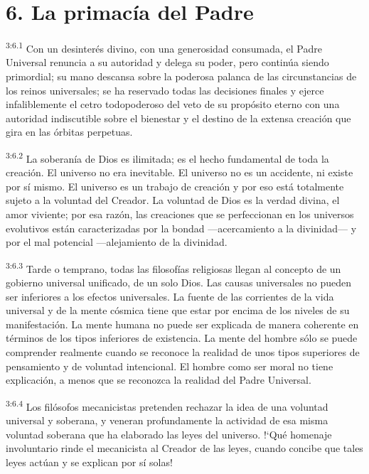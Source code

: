 \section*{6. La primacía del Padre}
\par
\textsuperscript{3:6.1} Con un desinterés divino, con una generosidad consumada, el Padre Universal renuncia a su autoridad y delega su poder, pero continúa siendo primordial; su mano descansa sobre la poderosa palanca de las circunstancias de los reinos universales; se ha reservado todas las decisiones finales y ejerce infaliblemente el cetro todopoderoso del veto de su propósito eterno con una autoridad indiscutible sobre el bienestar y el destino de la extensa creación que gira en las órbitas perpetuas.

\par
\textsuperscript{3:6.2} La soberanía de Dios es ilimitada; es el hecho fundamental de toda la creación. El universo no era inevitable. El universo no es un accidente, ni existe por sí mismo. El universo es un trabajo de creación y por eso está totalmente sujeto a la voluntad del Creador. La voluntad de Dios es la verdad divina, el amor viviente; por esa razón, las creaciones que se perfeccionan en los universos evolutivos están caracterizadas por la bondad ---acercamiento a la divinidad--- y por el mal potencial ---alejamiento de la divinidad.

\par
\textsuperscript{3:6.3} Tarde o temprano, todas las filosofías religiosas llegan al concepto de un gobierno universal unificado, de un solo Dios. Las causas universales no pueden ser inferiores a los efectos universales. La fuente de las corrientes de la vida universal y de la mente cósmica tiene que estar por encima de los niveles de su manifestación. La mente humana no puede ser explicada de manera coherente en términos de los tipos inferiores de existencia. La mente del hombre sólo se puede comprender realmente cuando se reconoce la realidad de unos tipos superiores de pensamiento y de voluntad intencional. El hombre como ser moral no tiene explicación, a menos que se reconozca la realidad del Padre Universal.

\par
\textsuperscript{3:6.4} Los filósofos mecanicistas pretenden rechazar la idea de una voluntad universal y soberana, y veneran profundamente la actividad de esa misma voluntad soberana que ha elaborado las leyes del universo. !`Qué homenaje involuntario rinde el mecanicista al Creador de las leyes, cuando concibe que tales leyes actúan y se explican por sí solas!

